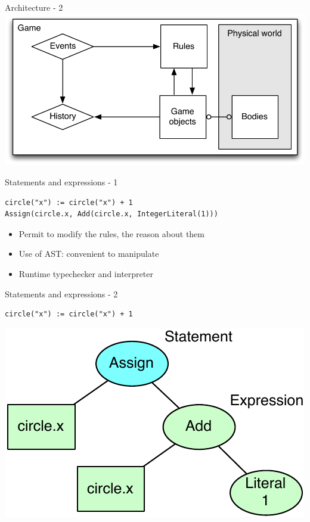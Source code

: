 \documentclass[12pt]{beamer}
\begin{document}
\begin{frame}{Architecture - 2}
\centering
\includegraphics[scale=0.65]{images/architecture-2}
\end{frame}

\begin{frame}[fragile]{Statements and expressions - 1}
\begin{lstlisting}
circle("x") := circle("x") + 1
Assign(circle.x, Add(circle.x, IntegerLiteral(1)))
\end{lstlisting}
\begin{itemize}
\item Permit to modify the rules, the reason about them
\item Use of AST: convenient to manipulate
\item Runtime typechecker and interpreter
\end{itemize}
\end{frame}

\begin{frame}[fragile]{Statements and expressions - 2}
\begin{lstlisting}
circle("x") := circle("x") + 1
\end{lstlisting}
\vspace*{5mm}
\begin{center}
\includegraphics[scale=0.8]{images/AST_example}
\end{center}
\end{frame}
\end{document}
